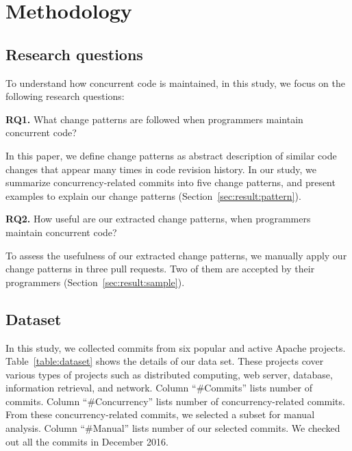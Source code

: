 \section{Methodology}
\label{sec:method}
\subsection{Research questions}
\label{sec:method:rq}
To understand how concurrent code is maintained, in this study, we focus on the following research questions:

\textbf{RQ1.} What change patterns are followed when programmers maintain concurrent code?


In this paper, we define change patterns as abstract description of similar code changes that appear many times in code revision history.  In our study, we summarize concurrency-related commits into five change patterns, and present examples to explain our change patterns (Section~\ref{sec:result:pattern}).

\textbf{RQ2.} How useful are our extracted change patterns, when programmers maintain concurrent code?

To assess the usefulness of our extracted change patterns, we manually apply our change patterns in three pull requests. Two of them are accepted by their programmers (Section~\ref{sec:result:sample}).



\subsection{Dataset}
\label{sec:method:data}
In this study, we collected commits from six popular and active Apache projects. Table~\ref{table:dataset} shows the details of our data set. These projects cover various types of projects such as distributed computing, web server, database, information retrieval, and network. Column ``\#Commits'' lists number of commits. Column ``\#Concurrency'' lists number of concurrency-related commits. From these concurrency-related commits, we selected a subset for manual analysis. Column ``\#Manual'' lists number of our selected commits. We checked out all the commits in December 2016. %


